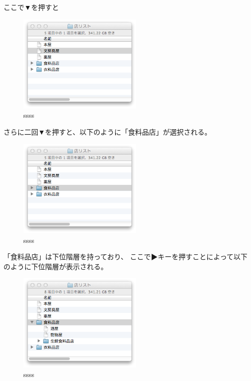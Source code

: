 \documentclass[twoside]{wiss}
\begin{document}
ここで▼を押すと

\begin{figure}[H]
\centerline{\includegraphics[width=60mm,bb=0 0 344 272]{figures/f43016d1b524baf414f2c32c48fe9588.png}}
\caption{ssss}
\label{screenshot}
\end{figure}

さらに二回▼を押すと、以下のように「食料品店」が選択される。

\begin{figure}[H]
\centerline{\includegraphics[width=60mm,bb=0 0 344 272]{figures/c074cd6daec3da0341125d1492b8a09c.png}}
\caption{ssss}
\label{screenshot}
\end{figure}

「食料品店」は下位階層を持っており、
ここで▶キーを押すことによって以下のように下位階層が表示される。

\begin{figure}[H]
\centerline{\includegraphics[width=60mm,bb=0 0 344 272]{figures/51d867d4721f65c18e84172c8818e137.png}}
\caption{ssss}
\label{screenshot}
\end{figure}
\end{document}
